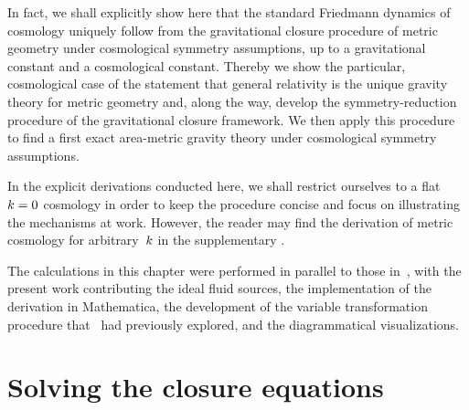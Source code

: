 In fact, we shall explicitly show here that the standard Friedmann dynamics of \FLRW{} cosmology uniquely follow from the gravitational closure procedure of metric geometry under cosmological symmetry assumptions, up to a gravitational constant and a cosmological constant. Thereby we show the particular, cosmological case of the statement that general relativity is the unique gravity theory for metric geometry and, along the way, develop the symmetry-reduction procedure of the gravitational closure framework. We then apply this procedure to find a first exact area-metric gravity theory under cosmological symmetry assumptions.

In the explicit derivations conducted here, we shall restrict ourselves to a flat~$k=0$ cosmology in order to keep the procedure concise and focus on illustrating the mechanisms at work. However, the reader may find the derivation of metric cosmology for arbitrary~$k$ in the supplementary .

The calculations in this chapter were performed in parallel to those in~\autocite{DuellPhd}, with the present work contributing the ideal fluid sources, the implementation of the derivation in Mathematica, the development of the variable transformation procedure that~\autocite{DuellMsc} had previously explored, and the diagrammatical visualizations.

\begin{figure}
	\begin{center}
		
	\end{center}
	\label{fig:CE_full}
\end{figure}


\section{Solving the closure equations}\label{sec:solve_closeqns}

